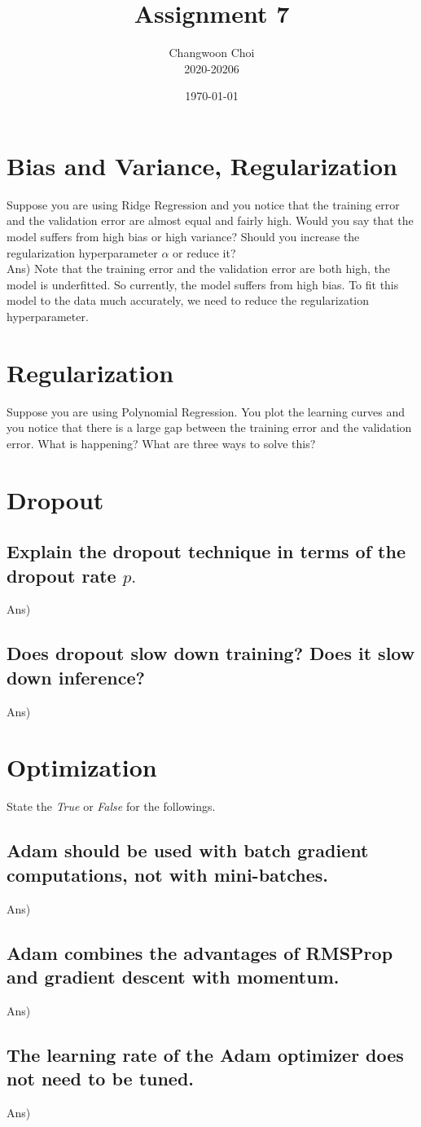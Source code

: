 \documentclass[12pt]{article}%
\begin{document}
\title{Assignment 7}
\author{Changwoon Choi \\ 2020-20206}
\date{\today}
\maketitle

\section{Bias and Variance, Regularization}
Suppose you are using Ridge Regression and you notice that the training error and the validation error are almost equal and fairly high. Would you say that the model suffers from high bias or high variance? Should you increase the regularization hyperparameter $\alpha$ or reduce it?
\\

Ans) Note that the training error and the validation error are both high, the model is underfitted. So currently, the model suffers from high bias. To fit this model to the data much accurately, we need to reduce the regularization hyperparameter.
\section{Regularization}
Suppose you are using Polynomial Regression. You plot the learning curves and you notice that there is a large gap between the training error and the validation error. What is happening? What are three ways to solve this?


\section{Dropout}

\subsection{Explain the dropout technique in terms of the dropout rate $p.$}
Ans) 
\subsection{Does dropout slow down training? Does it slow down inference?}
Ans)
\section{Optimization}
State the \textit{True} or \textit{False} for the followings.
\subsection{Adam should be used with batch gradient computations, not with mini-batches.}
Ans)
\subsection{Adam combines the advantages of RMSProp and gradient descent with momentum.}
Ans)
\subsection{The learning rate of the Adam optimizer does not need to be tuned.}
Ans)
\end{document}
